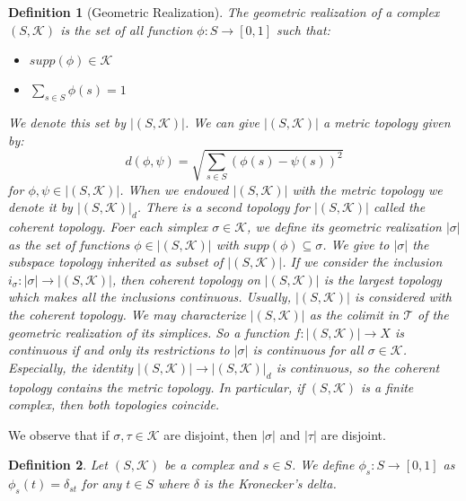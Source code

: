\documentclass{amsart}
\newtheorem{definition}{Definition}[section]
\begin{document}
\begin{definition}[Geometric Realization]
The geometric realization of a complex $(S,\mathcal{K})$ is the set of all function $\phi\colon S\longrightarrow [0,1]$ such that:
\begin{itemize}
\item $supp(\phi)\in\mathcal{K}$
\item $\sum_{s\in S}\phi(s)=1$
\end{itemize}
We denote this set by $\vert (S,\mathcal{K})\vert$. We can give $\vert (S,\mathcal{K})\vert$ a metric topology given by:
\[
d(\phi,\psi)=\sqrt{\sum_{s\in S}(\phi(s)-\psi(s))^{2}}
\]
for $\phi,\psi\in \vert (S,\mathcal{K})\vert$. When we endowed $\vert (S,\mathcal{K})\vert$ with the metric topology we denote it by $\vert (S,\mathcal{K})\vert_d$. There is a second topology for $\vert (S,\mathcal{K})\vert$ called the coherent topology. Foer each simplex $\sigma\in\mathcal{K}$, we define its geometric realization $\vert\sigma\vert$ as the set of functions $\phi\in \vert (S,\mathcal{K})\vert$ with $supp(\phi)\subseteq \sigma$. We give to $\vert \sigma\vert$ the subspace topology inherited as subset of $\vert (S,\mathcal{K})\vert$. If we consider the inclusion $i_\sigma\colon\vert\sigma\vert\longrightarrow \vert (S,\mathcal{K})\vert$, then coherent topology on $\vert (S,\mathcal{K})\vert$ is the largest topology which makes all the inclusions continuous. Usually, $\vert (S,\mathcal{K})\vert$ is considered with the coherent topology. We may characterize $\vert (S,\mathcal{K})\vert$ as the colimit  in $\mathcal{T}$ of the geometric realization of its simplices. So a function $f\colon\vert (S,\mathcal{K})\vert\longrightarrow X$ is continuous if and only its restrictions to $\vert\sigma\vert$ is continuous for all $\sigma\in\mathcal{K}$. Especially, the identity $\vert (S,\mathcal{K})\vert\longrightarrow \vert (S,\mathcal{K})\vert_d$ is continuous, so the coherent topology contains the metric topology. In particular, if $(S,\mathcal{K})$ is a finite complex, then both topologies coincide.
\end{definition}

We observe that if $\sigma, \tau\in\mathcal{K}$ are disjoint, then $\vert\sigma\vert$ and $\vert\tau\vert$ are disjoint.

\begin{definition}
Let $(S,\mathcal{K})$ be a complex and $s\in S$. We define $\phi_s\colon S\longrightarrow [0,1]$ as $\phi_s(t)=\delta_{st}$ for any $t\in S$ where $\delta$ is the Kronecker's delta.
\end{definition}
\end{document}
